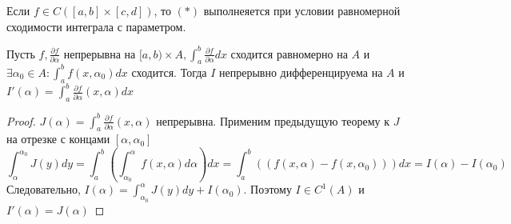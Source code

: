 \begin{corollary}
    Если \(f \in C([a, b] \times [c, d])\), то \((*)\) выполнеяется при условии равномерной сходимости интеграла с параметром.
\end{corollary}

\begin{theorem}
    Пусть \(f, \frac{\partial f}{\partial \alpha}\) непрерывна на \([a, b) \times A, \int_a^b \frac{\partial f}{\partial \alpha} dx\) сходится равномерно на \(A\) и \(\exists \alpha_0 \in A: \int_a^b f(x, \alpha_0)dx\) сходится. Тогда \(I\) непрерывно дифференцируема на \(A\) и \(I'(\alpha) = \int_a^b \frac{\partial f}{\partial \alpha} (x, \alpha) dx\)
\end{theorem}
\begin{proof}
    \(J(\alpha) = \int_a^b \frac{\partial f}{\partial \alpha}(x, \alpha)\) непрерывна. Применим предыдущую теорему к \(J\) на отрезке с концами \([\alpha, \alpha_0]\)
    \[\int_\alpha^{\alpha_0} J(y) dy = \int_a^b\left( \int_{\alpha_0}^\alpha f(x, \alpha)d\alpha \right) dx = \int_a^b ((f(x, \alpha) - f(x, \alpha_0)))dx = I(\alpha) - I(\alpha_0)\]
    Следовательно, \(I(\alpha) = \int_{\alpha_0}^{\alpha} J(y)dy + I(\alpha_0)\). Поэтому \(I \in C^1(A)\) и \(I'(\alpha) = J(\alpha)\)
\end{proof}


